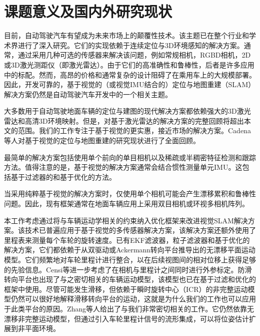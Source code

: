 \section{课题意义及国内外研究现状}

目前，自动驾驶汽车有望成为未来市场上的颠覆性技术。该主题已在整个行业和学术界进行了深入研究。它们的实现依赖于连续定位与3D环境感知的解决方案。通常，通过采用几种可选的传感器\cite{furgale13}来解决该问题，例如常规相机，RGBD相机，2D或3D激光测距仪（即激光雷达）。由于它们的高准确性和鲁棒性，后者是许多应用中的标配。然而，高昂的价格和通常复杂的设计阻碍了在乘用车上的大规模部署。因此，开发可靠的，基于视觉的（或视觉IMU结合的）定位与地图重建（SLAM）解决方案仍然是自动驾驶汽车开发中的一个相关主题。

大多数用于自动驾驶地面车辆的定位与建图的现代解决方案都依赖强大的3D激光雷达和高清3D环境映射\cite{levinson07,wan18}。但是，对基于激光雷达的解决方案的完整回顾将超出本文的范围。我们的工作专注于基于视觉的更实惠，接近市场的解决方案。Cadena等人\cite{cadena16}对基于视觉的定位与地图重建的研究现状进行了全面回顾。

最简单的解决方案包括使用单个前向的单目相机以及稀疏\cite{murartal15,engel14}或半稠密\cite{engel17}特征检测和跟踪方法。值得注意的是，基于视觉的解决方案通常会结合惯性测量单元IMU。这包括基于过滤器的\cite{li13}和基于优化的\cite{leutenegger15,lynen15,qin18}方法。

当采用纯粹基于视觉的解决方案时，仅使用单个相机可能会产生漂移累积和鲁棒性问题。因此，现有框架通常在地面车辆应用上采用双目相机\cite{nister06,konolige07,howard08,kitt10}或环视多相机阵列\cite{furgale13,heng18}。

本工作考虑通过将与车辆运动学相关的约束纳入优化框架来改进视觉SLAM解决方案。该技术已普遍应用于基于视觉的多传感器解决方案，该解决方案还额外使用了里程表来测量每个车轮的旋转速度。已有EKF滤波器\cite{wu17}，粒子滤波器\cite{yap11}和基于优化的\cite{quan18,kang2019vins}解决方案，它们都依赖于从双驱动或Ackermann转向平台推导出的无漂移平面运动模型。它们频繁地对车轮里程计进行整合，以在后续视图间的相对位移上获得足够的先验信息。Censi等\cite{censi13}进一步考虑了在相机与里程计之间同时进行外参标定。防滑转向平台\cite{yi09,martinez17,lv17}也出现了与之密切相关的车辆运动模型，该模型也已在基于过滤和优化的框架中使用。尽管可能发生滑移，但依赖于瞬时旋转中心（ICR）的非完整运动模型仍然可以很好地解释滑移转向平台的运动\cite{martinez05}，这就是为什么我们的工作也可以应用于此类平台的原因。Zhang等人给出了与我们非常密切相关的工作\cite{zhang19}。它仍然依靠无漂移非完整运动模型，但通过引入车轮里程计信号的流形集成，可以将位姿估计扩展到非平面环境。


